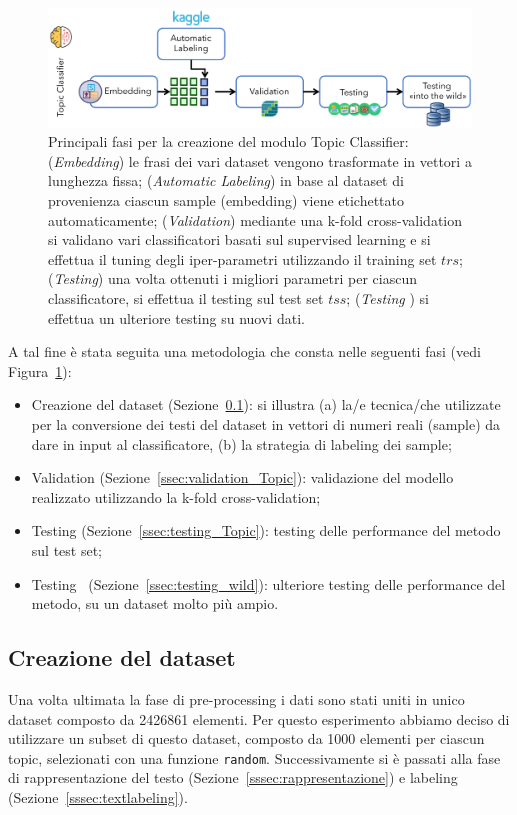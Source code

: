 \begin{figure}[h!t]
    \centering
    \includegraphics[width=15cm]{Figure/grafici/topicmethod_cropped.pdf}
    \caption{Principali fasi per la creazione del modulo Topic Classifier: (\textit{Embedding}) le frasi dei vari dataset vengono trasformate in vettori a lunghezza fissa; (\textit{Automatic Labeling}) in base al dataset di provenienza ciascun sample (embedding) viene etichettato automaticamente; (\textit{Validation}) mediante una k-fold cross-validation si validano vari classificatori basati sul supervised learning e si effettua il tuning degli iper-parametri utilizzando il training set $trs$; (\textit{Testing}) una volta ottenuti i migliori parametri per ciascun classificatore, si effettua il testing sul test set $tss$; (\textit{Testing }) si effettua un ulteriore testing su nuovi dati.}
    \label{fig:topicmethod}
\end{figure}

A tal fine è stata seguita una metodologia che consta nelle seguenti fasi (vedi Figura~\ref{fig:topicmethod}):
\begin{itemize}
    \item Creazione del dataset (Sezione~\ref{ssec:createds}): si illustra (a) la/e tecnica/che utilizzate per la conversione dei testi del dataset in vettori di numeri reali (sample) da dare in input al classificatore, (b) la strategia di labeling dei sample; 
    \item Validation (Sezione~\ref{ssec:validation_Topic}): validazione del modello realizzato utilizzando la k-fold cross-validation;
    \item Testing (Sezione~\ref{ssec:testing_Topic}): testing delle performance del metodo sul test set;
    \item Testing~ (Sezione~\ref{ssec:testing_wild}): ulteriore testing delle performance del metodo, su un dataset molto più ampio.
\end{itemize}

\subsection{Creazione del dataset}
\label{ssec:createds}
Una volta ultimata la fase di pre-processing i dati sono stati uniti in unico dataset composto da 2426861 elementi. Per questo esperimento abbiamo deciso di utilizzare un subset di questo dataset, composto da 1000 elementi per ciascun topic, selezionati con una funzione {\tt random}. Successivamente si è passati alla fase di rappresentazione del testo (Sezione~\ref{sssec:rappresentazione}) e labeling (Sezione~\ref{sssec:textlabeling}).

